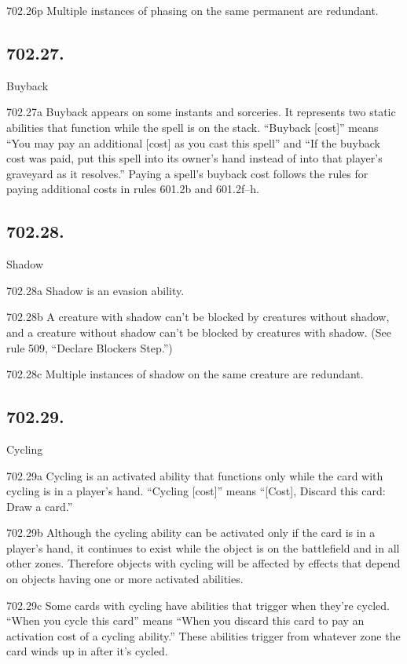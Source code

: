 702.26p Multiple instances of phasing on the same permanent are redundant.

\subsection*{702.27.}
Buyback

702.27a Buyback appears on some instants and sorceries. It represents two static abilities that function while the spell is on the stack. “Buyback [cost]” means “You may pay an additional [cost] as you cast this spell” and “If the buyback cost was paid, put this spell into its owner’s hand instead of into that player’s graveyard as it resolves.” Paying a spell’s buyback cost follows the rules for paying additional costs in rules 601.2b and 601.2f–h.

\subsection*{702.28.}
Shadow

702.28a Shadow is an evasion ability.

702.28b A creature with shadow can’t be blocked by creatures without shadow, and a creature without shadow can’t be blocked by creatures with shadow. (See rule 509, “Declare Blockers Step.”)

702.28c Multiple instances of shadow on the same creature are redundant.

\subsection*{702.29.}
Cycling

702.29a Cycling is an activated ability that functions only while the card with cycling is in a player’s hand. “Cycling [cost]” means “[Cost], Discard this card: Draw a card.”

702.29b Although the cycling ability can be activated only if the card is in a player’s hand, it continues to exist while the object is on the battlefield and in all other zones. Therefore objects with cycling will be affected by effects that depend on objects having one or more activated abilities.

702.29c Some cards with cycling have abilities that trigger when they’re cycled. “When you cycle this card” means “When you discard this card to pay an activation cost of a cycling ability.” These abilities trigger from whatever zone the card winds up in after it’s cycled.

